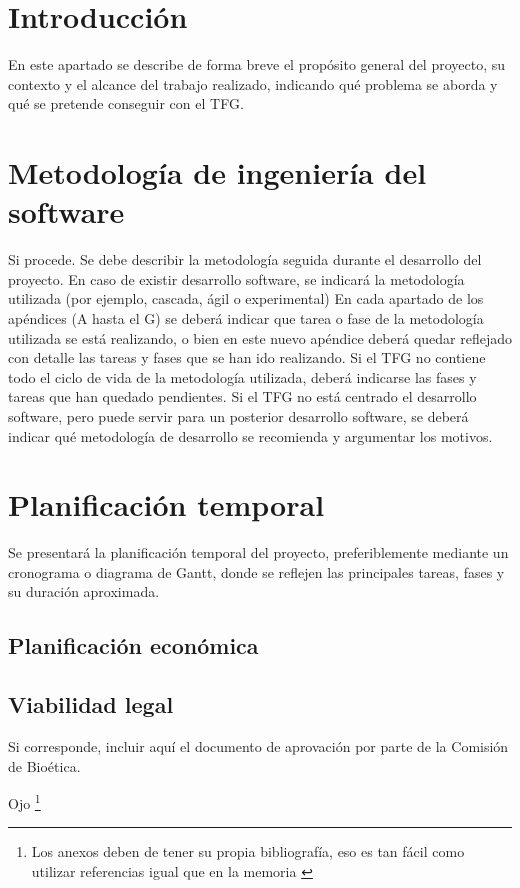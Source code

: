 
\section{Introducción}

En este apartado se describe de forma breve el propósito general del proyecto, su contexto y el alcance del trabajo realizado, indicando qué problema se aborda y qué se pretende conseguir con el TFG.


\section{Metodología de ingeniería del software}
Si procede.
Se debe describir la metodología seguida durante el desarrollo del proyecto. En caso de existir desarrollo software, se indicará la metodología utilizada (por ejemplo, cascada, ágil o experimental)
En cada apartado de los apéndices (A hasta el G) se deberá indicar que tarea o fase de la metodología utilizada se está realizando, o bien en este nuevo apéndice deberá quedar reflejado con detalle las tareas y fases que se han ido realizando.
Si el TFG no contiene  todo el ciclo de vida de la metodología utilizada, deberá indicarse las fases y tareas que han quedado pendientes.
Si el TFG no está centrado el desarrollo software, pero puede servir para un posterior desarrollo software, se deberá indicar qué metodología de desarrollo se recomienda y argumentar los motivos.


\section{Planificación temporal}

Se presentará la planificación temporal del proyecto, preferiblemente mediante un cronograma o diagrama de Gantt, donde se reflejen las principales tareas, fases y su duración aproximada.

\subsection{Planificación económica}

\subsection{Viabilidad legal}

Si corresponde, incluir aquí el documento de aprovación por parte de la Comisión de Bioética.

Ojo \footnote{Los anexos deben de tener su propia bibliografía, eso es tan fácil como utilizar referencias igual que en la memoria \cite{bortolot2005}}
